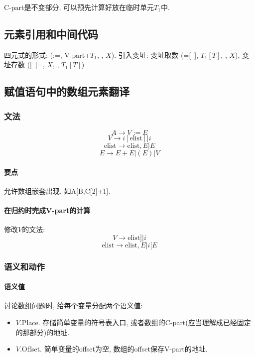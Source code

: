             C-part是不变部分, 可以预先计算好放在临时单元$T_1$中.

        \subsection{元素引用和中间代码}

            四元式的形式: (:=, V-part+$T_1$, \uline\quad, $X$). 引入\textsf{变址}: 变址取数 (=[\ ], $T_1[T]$, \uline\quad, $X$), 变址存数 ([\ ]=, $X$, \uline\quad, $T_1[T]$)

        \subsection{赋值语句中的数组元素翻译}

            \subsubsection{文法}

                \[A\to V:=E\]
                \[V\to i[\textrm{elist}]|i\]
                \[\textrm{elist}\to\textrm{elist},E|E\]
                \[E\to E+E|(E)|V\]

                \paragraph{要点}
                 允许数组嵌套出现, 如A[B,C[2]+1]. 

                \paragraph{在归约时完成V-part的计算}
                    修改$V$的文法:
                    \[V\to \textrm{elist}]|i\]
                    \[\textrm{elist}\to \textrm{elist}, E|i[E\]

            \subsubsection{语义和动作}

                \paragraph{语义值}
                    讨论数组问题时, 给每个变量分配两个语义值: 
                    \begin{itemize}
                        \item $V$.Place. 存储简单变量的符号表入口, 或者数组的C-part(应当理解成已经固定的那部分)的地址.
                        \item $V$.Offset. 简单变量的offset为空, 数组的offset保存V-part的地址.
                    \end{itemize}

